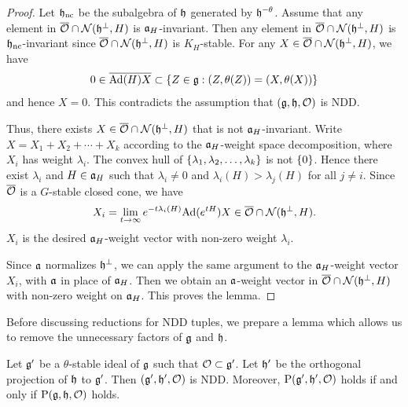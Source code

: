 \begin{proof}
	Let $\mathfrak{h}_{\mathrm{nc}}$ be the subalgebra of $\mathfrak{h}$ generated by $\mathfrak{h}^{-\theta}$.
	Assume that any element in $\overline{\mathcal{O}} \cap \mathcal{N}(\mathfrak{h}^\perp, H)$ is $\mathfrak{a}_H$-invariant.
	Then any element in $\overline{\mathcal{O}} \cap \mathcal{N}(\mathfrak{h}^\perp, H)$ is $\mathfrak{h}_{\mathrm{nc}}$-invariant since $\overline{\mathcal{O}}\cap \mathcal{N}(\mathfrak{h}^\perp, H)$ is $K_H$-stable.
	For any $X \in \overline{\mathcal{O}} \cap \mathcal{N}(\mathfrak{h}^\perp, H)$, we have
	\begin{align*}
		0 \in \overline{\mathrm{Ad}(H)X} \subset \left\{Z \in \mathfrak{g} : (Z, \theta(Z)) = (X, \theta(X)) \right\}
	\end{align*}
	and hence $X = 0$.
	This contradicts the assumption that $(\mathfrak{g}, \mathfrak{h}, \mathcal{O})$ is NDD.

	Thus, there exists $X \in \overline{\mathcal{O}} \cap \mathcal{N}(\mathfrak{h}^\perp, H)$ that is not $\mathfrak{a}_H$-invariant.
	Write $X = X_1 + X_2 + \cdots + X_k$ according to the $\mathfrak{a}_H$-weight space decomposition, where $X_i$ has weight $\lambda_i$.
	The convex hull of $\left\{\lambda_1, \lambda_2, \ldots, \lambda_k \right\}$ is not $\left\{0 \right\}$.
	Hence there exist $\lambda_i$ and $H \in \mathfrak{a}_H$ such that $\lambda_i \neq 0$ and $\lambda_i(H) > \lambda_j(H)$ for all $j \neq i$.
	Since $\overline{\mathcal{O}}$ is a $G$-stable closed cone, we have
	\begin{align*}
		X_i = \lim_{t \to \infty} e^{-t\lambda_i(H)}\mathrm{Ad}(e^{tH})X \in \overline{\mathcal{O}} \cap \mathcal{N}(\mathfrak{h}^\perp, H).
	\end{align*}
	$X_i$ is the desired $\mathfrak{a}_H$-weight vector with non-zero weight $\lambda_i$.

	Since $\mathfrak{a}$ normalizes $\mathfrak{h}^\perp$, we can apply the same argument to the $\mathfrak{a}_H$-weight vector $X_i$, with $\mathfrak{a}$ in place of $\mathfrak{a}_H$.
	Then we obtain an $\mathfrak{a}$-weight vector in $\overline{\mathcal{O}} \cap \mathcal{N}(\mathfrak{h}^\perp, H)$ with non-zero weight on $\mathfrak{a}_H$.
	This proves the lemma.
\end{proof}

Before discussing reductions for NDD tuples, we prepare a lemma which allows us to remove the unnecessary factors of $\mathfrak{g}$ and $\mathfrak{h}$.

\begin{lemma} \label{lem:ReductionIdeal}
	Let $\mathfrak{g'}$ be a $\theta$-stable ideal of $\mathfrak{g}$ such that $\mathcal{O}\subset \mathfrak{g'}$.
	Let $\mathfrak{h'}$ be the orthogonal projection of $\mathfrak{h}$ to $\mathfrak{g'}$.
	Then $(\mathfrak{g'}, \mathfrak{h'}, \mathcal{O})$ is NDD.
	Moreover, $\mathrm{P}(\mathfrak{g'}, \mathfrak{h'}, \mathcal{O})$ holds if and only if $\mathrm{P}(\mathfrak{g}, \mathfrak{h}, \mathcal{O})$ holds.
\end{lemma}

